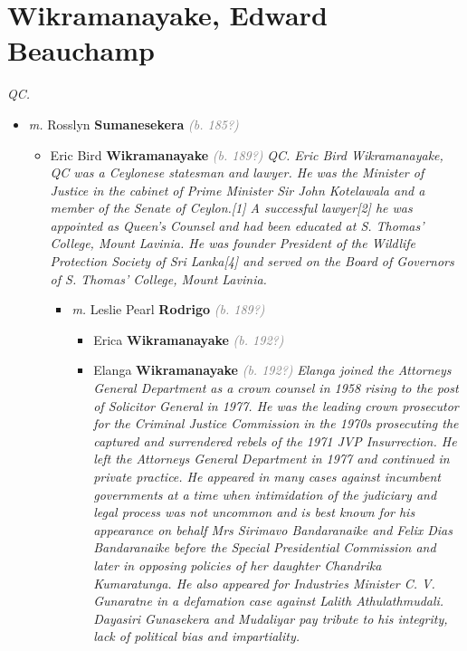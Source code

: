 \documentclass[10pt, openany]{book}
\begin{document}
\chapter{Wikramanayake, Edward Beauchamp}
\label{00003903}
\textcolor{slmaroon}{\textit{QC.}}
\begin{itemize}
\item{\textit{m.} Rosslyn \textbf{Sumanesekera} \textcolor{gray}{\textit{(b. 185?)}}   \label{couple:00003903:00003904} \begin{itemize}
\item{Eric Bird \textbf{Wikramanayake} \textcolor{gray}{\textit{(b. 189?)}} \textcolor{slmaroon}{\textit{QC.
Eric Bird Wikramanayake, QC was a Ceylonese statesman and lawyer. He was the Minister of Justice in the cabinet of Prime Minister Sir John Kotelawala and a member of the Senate of Ceylon.[1] A successful lawyer[2] he was appointed as Queen's Counsel and had been educated at S. Thomas' College, Mount Lavinia. He was founder President of the Wildlife Protection Society of Sri Lanka[4] and served on the Board of Governors of S. Thomas' College, Mount Lavinia.}}
\begin{itemize}
\item{\textit{m.} Leslie Pearl \textbf{Rodrigo} \textcolor{gray}{\textit{(b. 189?)}}   \label{couple:00003905:00003906} \begin{itemize}
\item{Erica \textbf{Wikramanayake} \textcolor{gray}{\textit{(b. 192?)}}
 }
\item{Elanga \textbf{Wikramanayake} \textcolor{gray}{\textit{(b. 192?)}} \textcolor{slmaroon}{\textit{Elanga joined the Attorneys General Department as a crown counsel in 1958 rising to the post of Solicitor General in 1977. He was the leading crown prosecutor for the Criminal Justice Commission in the 1970s prosecuting the captured and surrendered rebels of the 1971 JVP Insurrection. He left the Attorneys General Department in 1977 and continued in private practice. He appeared in many cases against incumbent governments at a time when intimidation of the judiciary and legal process was not uncommon and is best known for his appearance on behalf Mrs Sirimavo Bandaranaike and Felix Dias Bandaranaike before the Special Presidential Commission and later in opposing policies of her daughter Chandrika Kumaratunga. He also appeared for Industries Minister C. V. Gunaratne in a defamation case against Lalith Athulathmudali. Dayasiri Gunasekera and Mudaliyar pay tribute to his integrity, lack of political bias and impartiality.
}}}
\end{itemize}}
\end{itemize}}
\end{itemize}}
\end{itemize}
\end{document}
